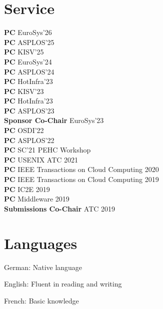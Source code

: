 \documentclass[margin,line]{cv/cv}
\begin{document}
\begin{resume}

    \section{\mysidestyle Service}
    \textbf{PC} EuroSys'26\\%
    \textbf{PC} ASPLOS'25\\%
    \textbf{PC} KISV'25\\%
    \textbf{PC} EuroSys'24\\%
    \textbf{PC} ASPLOS'24\\%
    \textbf{PC} HotInfra'23\\%
    \textbf{PC} KISV'23\\%
    \textbf{PC} HotInfra'23\\%
    \textbf{PC} ASPLOS'23\\%
    \textbf{Sponsor Co-Chair} EuroSys'23\\%
    \textbf{PC} OSDI'22\\%
    \textbf{PC} ASPLOS'22\\%
    \textbf{PC} SC'21 PEHC Workshop \\%
    \textbf{PC} USENIX ATC 2021 \\%
    \textbf{PC} IEEE Transactions on Cloud Computing 2020 \\%
    \textbf{PC} IEEE Transactions on Cloud Computing 2019 \\%
    \textbf{PC} IC2E 2019 \\%
    \textbf{PC} Middleware 2019 \\%
    \textbf{Submissions Co-Chair} ATC 2019 \\%


    \section{\mysidestyle Languages}
    \begin{list2}
        \item German: Native language
        \item English: Fluent in reading and writing
        \item French: Basic knowledge
    \end{list2}\vspace{-1.5mm}



\end{resume}
\end{document}
